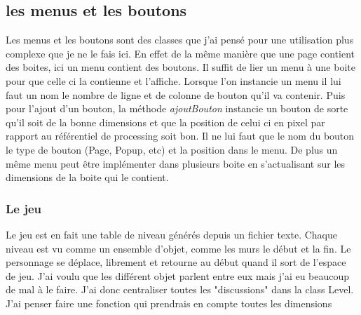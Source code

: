 \documentclass[10pt,a4paper]{article}
\begin{document}
\subsection{les menus et les boutons}
Les menus et les boutons sont des classes que j'ai pensé pour une utilisation plus complexe que je ne le fais ici. En effet de la même manière que une page contient des boites, ici un menu contient des boutons. Il suffit de lier un menu à une boite pour que celle ci la contienne et l'affiche. Lorsque l'on instancie un menu il lui faut un nom le nombre de ligne et de colonne de bouton qu'il va contenir. Puis pour l'ajout d'un bouton, la méthode \textit{ajoutBouton} instancie un bouton de sorte qu'il soit de la bonne dimensions et que la position de celui ci en pixel par rapport au référentiel de processing soit bon. Il ne lui faut que le nom du bouton le type de bouton (Page, Popup, etc) et la position dans le menu. De plus un même menu peut être implémenter dans plusieurs boite en s'actualisant sur les dimensions de la boite qui le contient.
\subsubsection{Le jeu}
Le jeu est en fait une table de niveau générés depuis un fichier texte. Chaque niveau est vu comme un ensemble d'objet, comme les murs le début et la fin. Le personnage se déplace, librement et retourne au début quand il sort de l'espace de jeu. J'ai voulu que les différent objet parlent entre eux mais j'ai eu beaucoup de mal à le faire. J'ai donc centraliser toutes les "discussions" dans la class Level. J'ai penser faire une fonction qui prendrais en compte toutes les dimensions 
\end{document}
